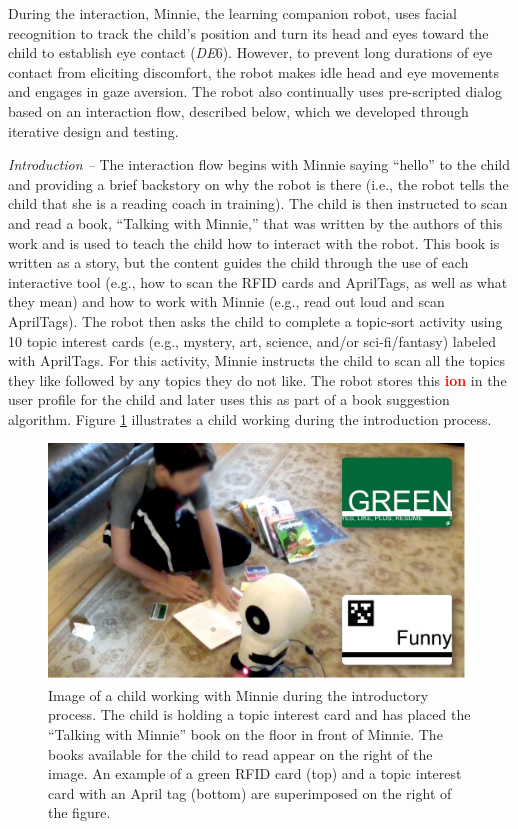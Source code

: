 \documentclass{sigchi}
\begin{document}
During the interaction, Minnie, the learning companion robot, uses facial recognition to track the child's position and turn its head and eyes toward the child to establish eye contact (\textit{DE}6). However, to prevent long durations of eye contact from eliciting discomfort, the robot makes idle head and eye movements and engages in gaze aversion. The robot also continually uses pre-scripted dialog based on an interaction flow, described below, which we developed through iterative design and testing.

\textit{Introduction --} The interaction flow begins with Minnie saying ``hello'' to the child and providing a brief backstory on why the robot is there (i.e., the robot tells the child that she is a reading coach in training). The child is then instructed to scan and read a book, ``Talking with Minnie,'' that was written by the authors of this work and is used to teach the child how to interact with the robot. This book is written as a story, but the content guides the child through the use of each interactive tool (e.g., how to scan the RFID cards and AprilTags, as well as what they mean) and how to work with Minnie (e.g., read out loud and scan AprilTags). The robot then asks the child to complete a topic-sort activity using 10 topic interest cards (e.g., mystery, art, science, and/or sci-fi/fantasy) labeled with AprilTags. For this activity, Minnie instructs the child to scan all the topics they like followed by any topics they do not like. The robot stores this \textcolor{red}{\textbf{ion}} in the user profile for the child and later uses this as part of a book suggestion algorithm. Figure \ref{fig:introduction} illustrates a child working during the introduction process.

\begin{figure}
	\centering
	\includegraphics[width=1\columnwidth]{figures/chi17-michaelis-figures-cards.jpg}
	\caption{Image of a child working with Minnie during the introductory process. The child is holding a topic interest card and has placed the ``Talking with Minnie'' book on the floor in front of Minnie. The books available for the child to read appear on the right of the image. An example of a green RFID card (top) and a topic interest card with an April tag (bottom) are superimposed on the right of the figure.}
	\label{fig:introduction}
\end{figure}
\end{document}
